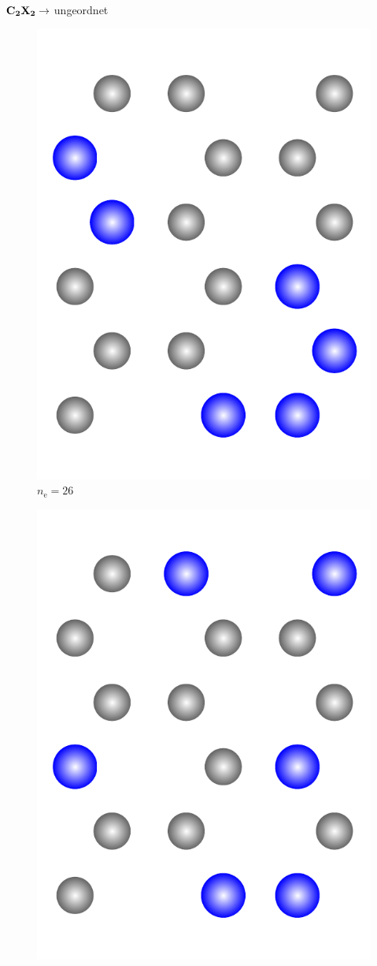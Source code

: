 \documentclass{beamer}
\def \nE {n_\mathrm{e}}
\begin{document}
\begin{frame}{$\bf C_{\boldsymbol 2}X_{\boldsymbol 2} \rightarrow$ ungeordnet}
\begin{figure}
\begin{minipage}[b]{0.19\textwidth}
				\includegraphics[height=1.1\textwidth]{Abbildungen/2.pdf} \\
				$\nE = 26$
			\end{minipage}
			\hfill
			\begin{minipage}[b]{0.19\textwidth}
				\centering
				\includegraphics[height=1.1\textwidth]{Abbildungen/3.pdf} \\

\end{minipage}
\end{figure}
\end{frame}
\end{document}

